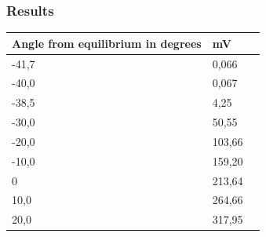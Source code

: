 \subsubsection{Results}
\begin{table}[H]
	\begin{tabular}{|l|l|p{4.3cm}|}
		\hline%
		\textbf{Angle from equilibrium in degrees}    &  \textbf{mV}         \\
		\hline%
		-41,7                                         & 0,066               \\
		\hline%
		-40,0 										  & 0,067               \\
		\hline%
		-38,5                              			  & 4,25               \\
		\hline%
		-30,0                              			  & 50,55               \\
		\hline%
		-20,0                                         & 103,66               \\
		\hline%
		-10,0 										  & 159,20               \\
		\hline%
		0                               			  & 213,64               \\
		\hline%
		10,0                                          & 264,66               \\
		\hline%
		20,0 										  & 317,95               \\
		\hline%

\end{tabular}
\end{table}
